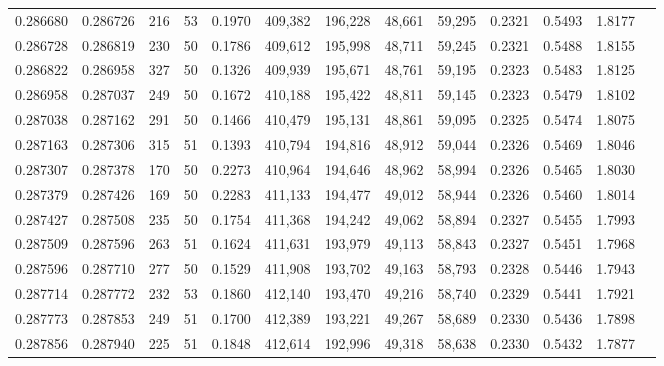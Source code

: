 \begin{tabular}{rrrrrrrrrrrrr}
0.286680 & 0.286726 &   216 &  53 &                                     0.1970 & 409,382 & 196,228 &  48,661 &  59,295 & 0.2321 & 0.5493 & 1.8177 \\
0.286728 & 0.286819 &   230 &  50 &                                     0.1786 & 409,612 & 195,998 &  48,711 &  59,245 & 0.2321 & 0.5488 & 1.8155 \\
0.286822 & 0.286958 &   327 &  50 &                                     0.1326 & 409,939 & 195,671 &  48,761 &  59,195 & 0.2323 & 0.5483 & 1.8125 \\
0.286958 & 0.287037 &   249 &  50 &                                     0.1672 & 410,188 & 195,422 &  48,811 &  59,145 & 0.2323 & 0.5479 & 1.8102 \\
0.287038 & 0.287162 &   291 &  50 &                                     0.1466 & 410,479 & 195,131 &  48,861 &  59,095 & 0.2325 & 0.5474 & 1.8075 \\
0.287163 & 0.287306 &   315 &  51 &                                     0.1393 & 410,794 & 194,816 &  48,912 &  59,044 & 0.2326 & 0.5469 & 1.8046 \\
0.287307 & 0.287378 &   170 &  50 &                                     0.2273 & 410,964 & 194,646 &  48,962 &  58,994 & 0.2326 & 0.5465 & 1.8030 \\
0.287379 & 0.287426 &   169 &  50 &                                     0.2283 & 411,133 & 194,477 &  49,012 &  58,944 & 0.2326 & 0.5460 & 1.8014 \\
0.287427 & 0.287508 &   235 &  50 &                                     0.1754 & 411,368 & 194,242 &  49,062 &  58,894 & 0.2327 & 0.5455 & 1.7993 \\
0.287509 & 0.287596 &   263 &  51 &                                     0.1624 & 411,631 & 193,979 &  49,113 &  58,843 & 0.2327 & 0.5451 & 1.7968 \\
0.287596 & 0.287710 &   277 &  50 &                                     0.1529 & 411,908 & 193,702 &  49,163 &  58,793 & 0.2328 & 0.5446 & 1.7943 \\
0.287714 & 0.287772 &   232 &  53 &                                     0.1860 & 412,140 & 193,470 &  49,216 &  58,740 & 0.2329 & 0.5441 & 1.7921 \\
0.287773 & 0.287853 &   249 &  51 &                                     0.1700 & 412,389 & 193,221 &  49,267 &  58,689 & 0.2330 & 0.5436 & 1.7898 \\
0.287856 & 0.287940 &   225 &  51 &                                     0.1848 & 412,614 & 192,996 &  49,318 &  58,638 & 0.2330 & 0.5432 & 1.7877 \\

\end{tabular}
